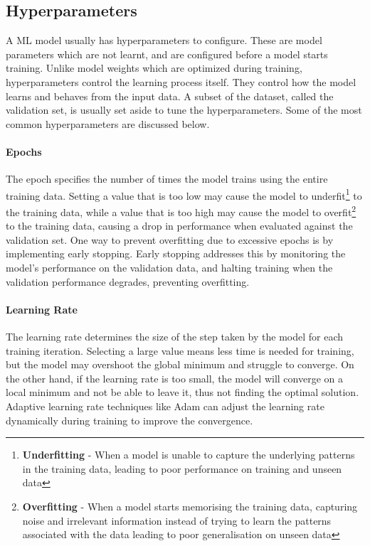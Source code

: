 \subsection{Hyperparameters}
A ML model usually has hyperparameters to configure. These are model parameters which are not learnt, and are configured before a model starts training. Unlike model weights which are optimized during training, hyperparameters control the learning process itself. They control how the model learns and behaves from the input data. A subset of the dataset, called the validation set, is usually set aside to tune the hyperparameters. Some of the most common hyperparameters are discussed below.

\paragraph{Epochs} \label{ML:Epochs} The epoch specifies the number of times the model trains using the entire training data. Setting a value that is too low may cause the model to underfit\footnote{\textbf{Underfitting} - When a model is unable to capture the underlying patterns in the training data, leading to poor performance on training and unseen data} to the training data, while a value that is too high may cause the model to overfit\footnote{\textbf{Overfitting} - When a model starts memorising the training data, capturing noise and irrelevant information instead of trying to learn the patterns associated with the data leading to poor generalisation on unseen data} to the training data, causing a drop in performance when evaluated against the validation set. One way to prevent overfitting due to excessive epochs is by implementing early stopping. Early stopping addresses this by monitoring the model's performance on the validation data, and halting training when the validation performance degrades, preventing overfitting.

\paragraph{Learning Rate} \label{ML:LearningRate} The learning rate determines the size of the step taken by the model for each training iteration. Selecting a large value means less time is needed for training, but the model may overshoot the global minimum and struggle to converge. On the other hand, if the learning rate is too small, the model will converge on a local minimum and not be able to leave it, thus not finding the optimal solution. Adaptive learning rate techniques like Adam can adjust the learning rate dynamically during training to improve the convergence.


